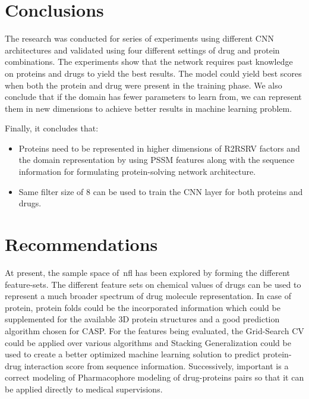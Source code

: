 \chapter{Conclusions}

The research was conducted for series of experiments using different CNN architectures and validated using four different settings of drug and protein combinations. The experiments show that the network requires past knowledge on proteins and drugs to yield the best results. The model could yield best scores when both the protein and drug were present in the training phase. We also conclude that if the domain has fewer parameters to learn from, we can represent them in new dimensions to achieve better results in machine learning problem.

Finally, it concludes that:
\begin{itemize}
    \item Proteins need to be represented in higher dimensions of R2RSRV factors and the domain representation by using PSSM features along with the sequence information for formulating protein-solving network architecture.
    \item Same filter size of 8 can be used to train the CNN layer for both proteins and drugs.
\end{itemize}

\chapter{Recommendations}

At present, the sample space of~\acrfull{nfl} has been explored by forming the different feature-sets. The different feature sets on chemical values of drugs can be used to represent a much broader spectrum of drug molecule representation. In case of protein, protein folds could be the incorporated information which could be supplemented for the available 3D protein structures and a good prediction algorithm chosen for CASP\citep{CASP82008}. For the features being evaluated, the Grid-Search CV could be applied over various algorithms and Stacking Generalization could be used to create a better optimized machine learning solution to predict protein-drug interaction score from sequence information. Successively, important is a correct modeling of Pharmacophore modeling of drug-proteins pairs so that it can be applied directly to medical supervisions. 

